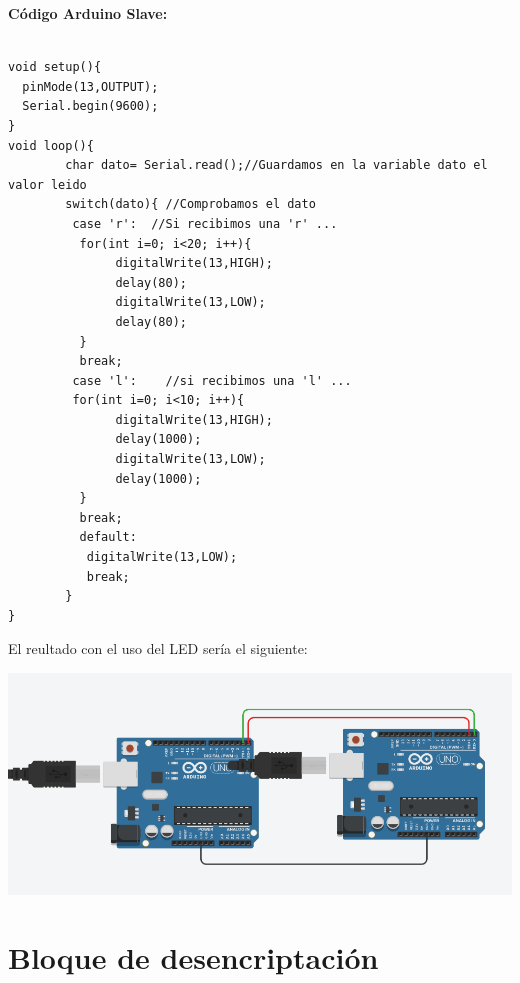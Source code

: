 \documentclass{article}
\begin{document}
\textbf{Código Arduino Slave: }
\begin{verbatim}

void setup(){ 
  pinMode(13,OUTPUT);
  Serial.begin(9600);
}
void loop(){ 
        char dato= Serial.read();//Guardamos en la variable dato el valor leido
        switch(dato){ //Comprobamos el dato
         case 'r':  //Si recibimos una 'r' ...
          for(int i=0; i<20; i++){
               digitalWrite(13,HIGH);
               delay(80);
               digitalWrite(13,LOW);
               delay(80);
          }
          break;
         case 'l':    //si recibimos una 'l' ...
         for(int i=0; i<10; i++){
               digitalWrite(13,HIGH);
               delay(1000);
               digitalWrite(13,LOW);
               delay(1000);
          }
          break;
          default:
           digitalWrite(13,LOW);
           break;
        }
}

\end{verbatim}

El reultado con el uso del LED sería el siguiente:

\includegraphics[scale=0.4]{figura4.png}
\newpage
\section{Bloque de desencriptación}
\label{Bloque de desencriptación}






\newpage
\end{document}
